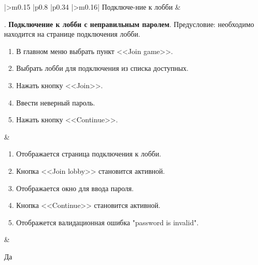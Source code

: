 \begin{landscape}
\begin{longtable}[l]{|>{\centering}m{0.15\textwidth}
					  |p{0.8\textwidth}
					  |p{0.34\textwidth}
					  |>{\centering\arraybackslash}m{0.16\textwidth}|}
	Подключе-ние к лобби &
	\begin{minipage}[t]{1\linewidth}
		\vspace{-1.5\baselineskip}
		\testnumber. \textbf{Подключение к лобби с неправильным паролем}.\newline
 		Предусловие: необходимо находится на странице подключения лобби.
 		\begin{enumerate}
			\item В главном меню выбрать пункт <<Join game>>.
 			\item Выбрать лобби для подключения из списка доступных.
 			\item Нажать кнопку <<Join>>.
 			\item Ввести неверный пароль.
 			\item Нажать кнопку <<Continue>>.
 		\end{enumerate}
 	\end{minipage} &
	\begin{minipage}[t]{1\linewidth}
		\vspace{-1.5\baselineskip}
		\begin{enumerate}
			\item Отображается страница подключения к лобби.
			\item Кнопка <<Join lobby>> становится активной.
   			\item Отображается окно для ввода пароля.
      		\item Кнопка <<Continue>> становится активной.
   			\item Отображется валидационная ошибка "password is invalid".
		\end{enumerate}
	\end{minipage} &
	\begin{minipage}[t]{1\linewidth}
		\vspace{-1.5\baselineskip}
		\centering Да
	\end{minipage} \\
	\hline

	\end{longtable}
\end{landscape}

\renewcommand{\labelenumi}{\asbuk{enumi})}
\renewcommand{\labelenumii}{\arabic{enumii})}